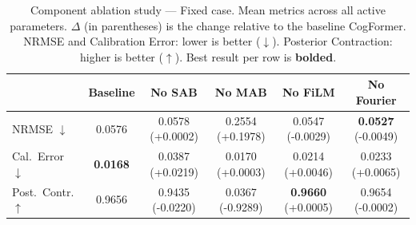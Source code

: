 \begin{table}[t]
\centering
\caption{Component ablation study — Fixed case. Mean metrics across
all active parameters. $\Delta$ (in parentheses) is the change relative to the
baseline CogFormer. NRMSE and Calibration Error: lower is better ($\downarrow$).
Posterior Contraction: higher is better ($\uparrow$). Best result per row is
\textbf{bolded}.}
\label{tab:component_ablation_fixed}
\begin{tabular}{lccccc}
\toprule
 & Baseline & No SAB & No MAB & No FiLM & No Fourier \\
\midrule
NRMSE $\downarrow$ & 0.0576 & 0.0578 \small{(+0.0002)} & 0.2554 \small{(+0.1978)} & 0.0547 \small{(-0.0029)} & \textbf{0.0527} \small{(-0.0049)} \\
Cal.\ Error $\downarrow$ & \textbf{0.0168} & 0.0387 \small{(+0.0219)} & 0.0170 \small{(+0.0003)} & 0.0214 \small{(+0.0046)} & 0.0233 \small{(+0.0065)} \\
Post.\ Contr. $\uparrow$ & 0.9656 & 0.9435 \small{(-0.0220)} & 0.0367 \small{(-0.9289)} & \textbf{0.9660} \small{(+0.0005)} & 0.9654 \small{(-0.0002)} \\
\bottomrule
\end{tabular}
\end{table}